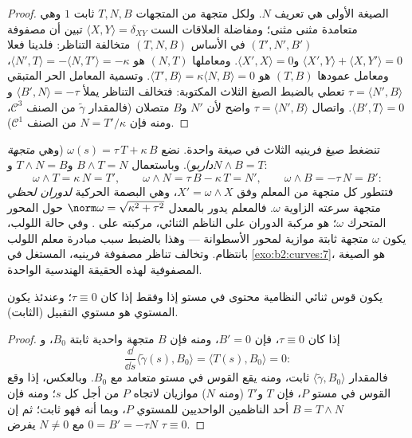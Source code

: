 \begin{proof}
الصيغة الأولى هي تعريف $N$. ولكل متجهة من المتجهات $T, N, B$ 
ثابت $1$ وهي متعامدة مثنى مثنى؛ ومفاضلة العلاقات الست $\langle X, Y\rangle = \delta_{XY}$
تبين أن مصفوفة $(T', N', B')$ في الأساس $(T, N, B)$ متخالفة التناظر: فلدينا
فعلا $\langle X', Y\rangle + \langle X, Y'\rangle = 0$ و$\langle X', X\rangle = 0$. ومعاملها $(N, T)$ هو $\langle N', T\rangle =
-\langle N, T'\rangle = -\kappa$، ومعامل عمودها
$(T, B)$ هو $\langle T', B\rangle = \kappa\langle N, B\rangle = 0$. وتسمية المعامل الحر المتبقي $\tau = \langle N', B\rangle$ تعطي بالضبط
الصيغ الثلاث المكتوبة: فتخالف التناظر يملأ $\langle B', N\rangle = -\tau$ و$\langle B', T\rangle = 0$. واتصال
$\tau = \langle N', B\rangle$ واضح لأن $N'$ و$B$ متصلان (فالمقدار $\tilde\gamma$ من الصنف
$\mathcal{C}^3$، ومنه فإن $N = T'/\kappa$ من الصنف $\mathcal{C}^1$).
\end{proof}

\begin{example}\label{ex:b2:curves:darboux}
تنضغط صيغ فرينيه الثلاث في صيغة واحدة. نضع $\omega(s) =
\tau\,T + \kappa\,B$ (وهي \emph{متجهة
داربو}). وباستعمال $B
\wedge T = N$ و$T \wedge N = B$ و$N \wedge B = T$:
\[
\omega \wedge T = \kappa\,N = T', \qquad
\omega \wedge N = \tau\,B - \kappa\,T = N', \qquad
\omega \wedge B = -\tau\,N = B' :
\]
فتتطور كل متجهة من المعلم وفق $X' = \omega \wedge X$، وهي البصمة الحركية
\emph{لدوران لحظي} متجهة سرعته الزاوية $\omega$. فالمعلم يدور بالمعدل
$\norm\omega = \sqrt{\kappa^2 + \tau^2}$ حول المحور المتحرك $\omega$؛  هو مركبة الدوران على
الناظم الثنائي،  مركبته على . وفي حالة اللولب، يكون
$\omega$ متجهة ثابتة موازية لمحور الأسطوانة --- وهذا بالضبط سبب
مبادرة معلم اللولب بانتظام. وتخالف تناظر مصفوفة فرينيه، المستغل في
\cref{exo:b2:curves:7}، هو الصيغة المصفوفية لهذه الحقيقة الهندسية الواحدة.
\end{example}

\begin{proposition}\label{prop:b2:curves:torsion}
يكون قوس ثنائي النظامية محتوى في مستو إذا وفقط إذا كان $\tau
\equiv 0$؛
وعندئذ يكون المستوي هو مستوي التقبيل (الثابت).
\end{proposition}

\begin{proof}
إذا كان $\tau \equiv 0$، فإن $B' = 0$، ومنه فإن $B$ متجهة واحدية ثابتة $B_0$،
و
\[
\frac{\dd}{\dd s}\langle \tilde\gamma(s), B_0\rangle
= \langle T(s), B_0\rangle = 0 :
\]
فالمقدار $\langle \tilde\gamma, B_0\rangle$ ثابت، ومنه يقع القوس في مستو متعامد مع $B_0$.
وبالعكس، إذا وقع القوس في مستو $P$، فإن $T$ و$T'$ (ومنه
$N$) موازيان لاتجاه $P$ من أجل كل $s$؛ ومنه فإن $B = T \wedge N$
أحد الناظمين الواحديين للمستوي $P$، وبما أنه  فهو ثابت؛ ثم
إن $0 = B'
= -\tau N$ مع $N \neq 0$ يفرض $\tau \equiv 0$.
\end{proof}

